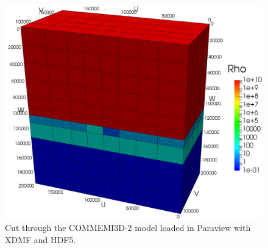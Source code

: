 \documentclass[10pt,a4paper]{article}
\begin{document}
\begin{figure}
\centerline{\includegraphics[width=\textwidth]{Figs/commemi.png}}
\caption{Cut through the COMMEMI3D-2 model loaded in Paraview with XDMF and HDF5.}
\label{fig:commemi}
\end{figure}




%
\end{document}
